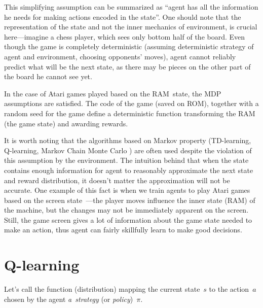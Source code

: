 This simplifying assumption can be summarized as ``agent has all the information he needs for making actions encoded in the state''. One should note that the representation of the state and not the inner mechanics of environment, is crucial here---imagine a chess player, which sees only bottom half of the board. Even though the game is completely deterministic (assuming deterministic strategy of agent and environment, choosing opponents' moves), agent cannot reliably predict what will be the next state, as there may be pieces on the other part of the board he cannot see yet.

In the case of Atari games played based on the RAM~state, the MDP assumptions are satisfied. The code of the game (saved on ROM), together with a random seed for the game define a deterministic function transforming the RAM (the game state) and awarding rewards.

It is worth noting that the algorithms based on Markov property (TD-learning, Q-learning, Markov Chain Monte Carlo \cite[Chapters 6.1, 6.5 and 5, respectively]{reinforcement-book}) are often used despite the violation of this assumption by the environment. The intuition behind that when the state contains enough information for agent to reasonably approximate the next state and reward distribution, it doesn't matter the approximation will not be accurate. One example of this fact is when we train agents to play Atari games based on the screen state~\cite{nips-dqn}---the player moves influence the inner state (RAM) of the machine, but the changes may not be immediately apparent on the screen. Still, the game screen gives a lot of information about the game state needed to make an action, thus agent can fairly skillfully learn to make good decisions.

\section{Q-learning}\label{qlearning}
Let's call the function (distribution) mapping the current state~$s$ to the action~$a$ chosen by the agent \emph{a~strategy} (or \emph{policy})~$\pi$.

